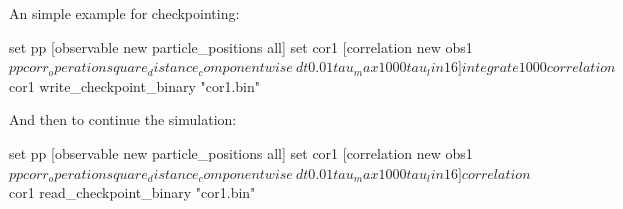An simple example for checkpointing:
\begin{tclcode}
set pp  [observable new particle_positions all]
set cor1 [correlation new obs1 $pp corr_operation square_distance_componentwise \
dt 0.01 tau_max 1000 tau_lin 16]
integrate 1000
correlation $cor1 write_checkpoint_binary "cor1.bin"
\end{tclcode}
And then to continue the simulation:
\begin{tclcode}
set pp  [observable new particle_positions all]
set cor1 [correlation new obs1 $pp corr_operation square_distance_componentwise \
dt 0.01 tau_max 1000 tau_lin 16]
correlation $cor1 read_checkpoint_binary "cor1.bin"
\end{tclcode}
